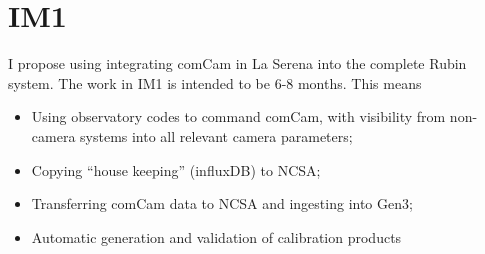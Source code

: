 \section{IM1}

I propose using integrating comCam in La Serena into the complete Rubin system. The work in IM1 is
intended to be 6-8 months.
This means
\begin{itemize}
\item Using observatory codes to command comCam, with visibility from non-camera systems
  into all relevant camera parameters;
\item Copying ``house keeping'' (\eg influxDB) to NCSA;
\item Transferring comCam data to NCSA and ingesting into Gen3;
\item Automatic generation and validation of calibration products
\end{itemize}

